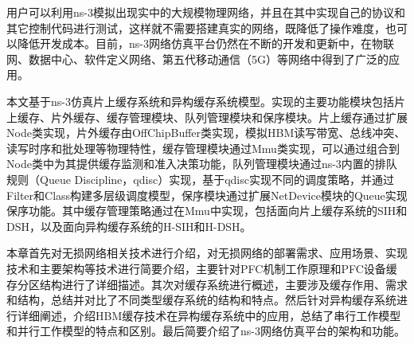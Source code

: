 用户可以利用ns-3模拟出现实中的大规模物理网络，并且在其中实现自己的协议和其它控制代码进行测试，这样就不需要搭建真实的网络，既降低了操作难度，也可以降低开发成本。目前，ns-3网络仿真平台仍然在不断的开发和更新中，在物联网、数据中心、软件定义网络、第五代移动通信（5G）等网络中得到了广泛的应用。

本文基于ns-3仿真片上缓存系统和异构缓存系统模型。实现的主要功能模块包括片上缓存、片外缓存、缓存管理模块、队列管理模块和保序模块。片上缓存通过扩展Node类实现，片外缓存由OffChipBuffer类实现，模拟HBM读写带宽、总线冲突、读写时序和批处理等物理特性，缓存管理模块通过Mmu类实现，可以通过组合到Node类中为其提供缓存监测和准入决策功能，队列管理模块通过ns-3内置的排队规则（Queue Discipline，qdisc）实现，基于qdisc实现不同的调度策略，并通过Filter和Class构建多层级调度模型，保序模块通过扩展NetDevice模块的Queue实现保序功能。其中缓存管理策略通过在Mmu中实现，包括面向片上缓存系统的SIH和DSH，以及面向异构缓存系统的H-SIH和H-DSH。



本章首先对无损网络相关技术进行介绍，对无损网络的部署需求、应用场景、实现技术和主要架构等技术进行简要介绍，主要针对PFC机制工作原理和PFC设备缓存分区结构进行了详细描述。其次对缓存系统进行概述，主要涉及缓存作用、需求和结构，总结并对比了不同类型缓存系统的结构和特点。然后针对异构缓存系统进行详细阐述，介绍HBM缓存技术在异构缓存系统中的应用，总结了串行工作模型和并行工作模型的特点和区别。最后简要介绍了ns-3网络仿真平台的架构和功能。

\clearpage